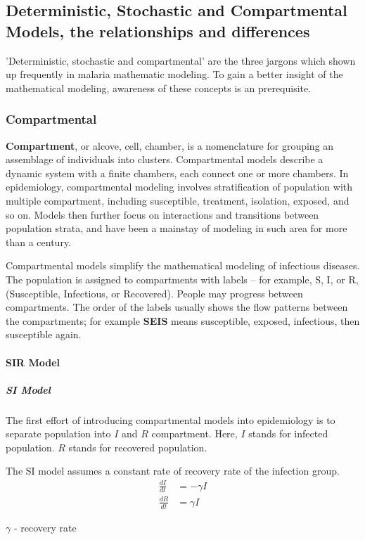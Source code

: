 \documentclass[a4paper, 12pt, twoside]{article}
\begin{document}
\subsection{Deterministic, Stochastic and Compartmental Models, the relationships and differences}
'Deterministic, stochastic and compartmental' are the three jargons which shown up frequently in malaria mathematic modeling.
To gain a better insight of the mathematical modeling, awareness of these concepts is an prerequisite.

\subsubsection{Compartmental}%
\label{subsubsec:compartmental}
\textbf{Compartment}, or alcove, cell, chamber, is a nomenclature for grouping an assemblage of individuals into clusters.
Compartmental models describe a dynamic system with a finite chambers, each connect one or more chambers.
In epidemiology, compartmental modeling involves stratification of population with multiple compartment, including susceptible, treatment, isolation, exposed, and so on.
Models then further focus on interactions and transitions between population strata, and have been a mainstay of modeling in such area for more than a century.

Compartmental models simplify the mathematical modeling of infectious diseases.
The population is assigned to compartments with labels – for example, S, I, or R, (Susceptible, Infectious, or Recovered).
People may progress between compartments. The order of the labels usually shows the flow patterns between the compartments; for example \textbf{SEIS} means susceptible, exposed, infectious, then susceptible again.

\paragraph{SIR Model}
\subparagraph{SI Model}
The first effort of introducing compartmental models into epidemiology is to separate population into $I$ and $R$ compartment.
Here, $I$ stands for infected population.
$R$ stands for recovered population.

The SI model assumes a constant rate of recovery rate of the infection group.
\begin{align}
	\frac{dI}{dt} & = - \gamma I \\
	\frac{dR}{dt} & = \gamma I
\end{align}

$\gamma$ - recovery rate
\end{document}
